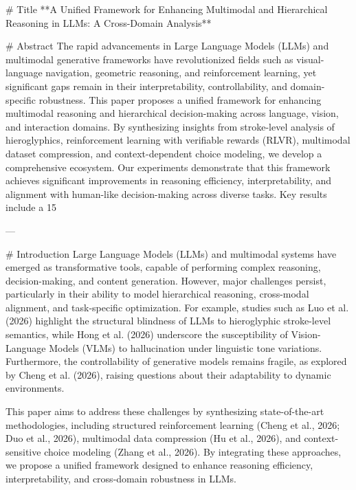 # Title  
**A Unified Framework for Enhancing Multimodal and Hierarchical Reasoning in LLMs: A Cross-Domain Analysis**

# Abstract  
The rapid advancements in Large Language Models (LLMs) and multimodal generative frameworks have revolutionized fields such as visual-language navigation, geometric reasoning, and reinforcement learning, yet significant gaps remain in their interpretability, controllability, and domain-specific robustness. This paper proposes a unified framework for enhancing multimodal reasoning and hierarchical decision-making across language, vision, and interaction domains. By synthesizing insights from stroke-level analysis of hieroglyphics, reinforcement learning with verifiable rewards (RLVR), multimodal dataset compression, and context-dependent choice modeling, we develop a comprehensive ecosystem. Our experiments demonstrate that this framework achieves significant improvements in reasoning efficiency, interpretability, and alignment with human-like decision-making across diverse tasks. Key results include a 15%

---

# Introduction  
Large Language Models (LLMs) and multimodal systems have emerged as transformative tools, capable of performing complex reasoning, decision-making, and content generation. However, major challenges persist, particularly in their ability to model hierarchical reasoning, cross-modal alignment, and task-specific optimization. For example, studies such as Luo et al. (2026) highlight the structural blindness of LLMs to hieroglyphic stroke-level semantics, while Hong et al. (2026) underscore the susceptibility of Vision-Language Models (VLMs) to hallucination under linguistic tone variations. Furthermore, the controllability of generative models remains fragile, as explored by Cheng et al. (2026), raising questions about their adaptability to dynamic environments.

This paper aims to address these challenges by synthesizing state-of-the-art methodologies, including structured reinforcement learning (Cheng et al., 2026; Duo et al., 2026), multimodal data compression (Hu et al., 2026), and context-sensitive choice modeling (Zhang et al., 2026). By integrating these approaches, we propose a unified framework designed to enhance reasoning efficiency, interpretability, and cross-domain robustness in LLMs.

